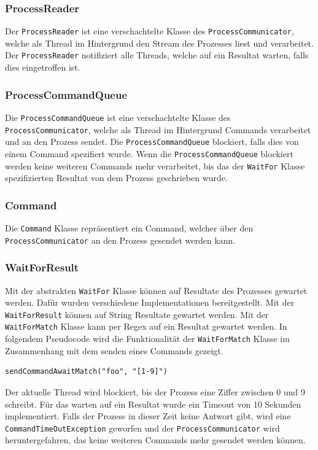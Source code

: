 \subsubsection{ProcessReader}

Der \verb!ProcessReader! ist eine verschachtelte Klasse des \verb!ProcessCommunicator!, welche als Thread im Hintergrund den Stream des Prozesses liest und verarbeitet. Der \verb!ProcessReader! notifiziert alle Threads, welche auf ein Resultat warten, falls dies eingetroffen ist.

\subsubsection{ProcessCommandQueue}

Die \verb!ProcessCommandQueue! ist eine verschachtelte Klasse des \verb!ProcessCommunicator!, welche als Thread im Hintergrund Commands verarbeitet und an den Prozess sendet. Die \verb!ProcessCommandQueue! blockiert, falls dies von einem Command spezifiert wurde. Wenn die \verb!ProcessCommandQueue! blockiert werden keine weiteren Commands mehr verarbeitet, bis das der \verb!WaitFor! Klasse spezifizierten Resultat von dem Prozess geschrieben wurde.

\subsubsection{Command}

Die \verb!Command! Klasse repräsentiert ein Command, welcher über den \verb!ProcessCommunicator! an den Prozess gesendet werden kann.

\subsubsection{WaitForResult}

Mit der abstrakten \verb!WaitFor! Klasse können auf Resultate des Prozesses gewartet werden. Dafür wurden verschiedene Implementationen bereitgestellt. Mit der \verb!WaitForResult! können auf String Resultate gewartet werden. Mit der \verb!WaitForMatch! Klasse kann per Regex auf ein Resultat gewartet werden. In folgendem Pseudocode wird die Funktionalität der \verb!WaitForMatch! Klasse im Zusammenhang mit dem senden eines Commands gezeigt.

\begin{verbatim}
sendCommandAwaitMatch("foo", "[1-9]")
\end{verbatim}

Der aktuelle Thread wird blockiert, bis der Prozess eine Ziffer zwischen 0 und 9 schreibt. Für das warten auf ein Resultat wurde ein Timeout von 10 Sekunden implementiert. Falls der Prozess in dieser Zeit keine Antwort gibt, wird eine \verb!CommandTimeOutException! geworfen und der \verb!ProcessCommunicator! wird heruntergefahren, das keine weiteren Commands mehr gesendet werden können.



